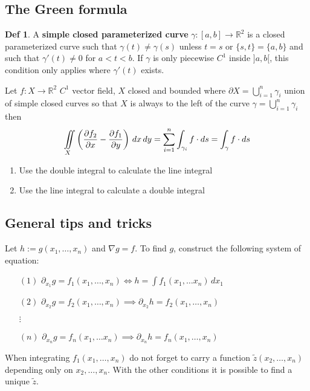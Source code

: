 \documentclass[a4paper, 10pt]{article}
\theoremstyle{definition}
\newtheorem*{definition}{Def}
\newcommand{\R}{\mathbb{R}}
\begin{document}
\pagebreak
\subsection{The Green formula}

\begin{definition}
    A \textbf{simple closed parameterized curve} \(\gamma:[a, b] \to \R^2\) is a closed parameterized curve such that \(\gamma(t) \neq \gamma(s)\) unless \(t = s\) or \(\{s, t\} = \{a, b\}\) and such that \(\gamma'(t) \neq 0\) for \(a < t < b\). If \(\gamma\) is only piecewise \(C^1\) inside \(]a, b[\), this condition only applies where \(\gamma'(t)\) exists.
\end{definition}

\begin{ntheorem*}
    Let \(f: X \to \R^2\) \(C^1\) vector field, \(X\) closed and bounded where \(\partial X = \bigcup_{i = 1}^n \gamma_i\) union of simple closed curves so that \(X\)  is always to the left of the curve \(\gamma = \bigcup_{i = 1}^n \gamma_i\) then
    \[\iint\displaylimits_{X} \left(\frac{\partial f_2}{\partial x} - \frac{\partial f_1}{\partial y}\right) \, dx \, dy = \sum_{i =1}^n \int_{\gamma_i} f \cdot ds = \int_\gamma f \cdot ds\]
\end{ntheorem*}

\begin{note*}
    \begin{enumerate}
        \item Use the double integral to calculate the line integral
        \item Use the line integral to calculate a double integral
    \end{enumerate}
\end{note*}

\subsection*{General tips and tricks}
\begin{note*}
    Let \(h:=g(x_1, \dots, x_n)\) and \(\nabla g = f\). 
    To find \(g\), construct the following system of equation:
    \begin{itemize}
        \item[\((1)\)] \(\partial_{x_1} g = f_1(x_1, \ldots, x_n) \iff h = \int f_1(x_1, \ldots x_n) \,dx_1\)
        \item[\((2)\)] \(\partial_{x_2} g = f_2(x_1, \ldots, x_n) \implies \partial_{x_2} h = f_2(x_1, \ldots, x_n)\)
        \item[\(\vdots\)]
        \item[\((n)\)]  \(\partial_{x_n} g = f_n(x_1, \ldots x_n) \implies \partial_{x_n} h = f_n(x_1, \ldots, x_n)\)
    \end{itemize}
    When integrating \(f_1(x_1, \dots, x_n)\) do not forget to carry a function \(\tilde{z}(x_2, \ldots, x_n)\) depending only on \(x_2, \ldots, x_n\). With the other conditions it is possible to find a unique \(\tilde{z}\).
\end{note*}
\end{document}
